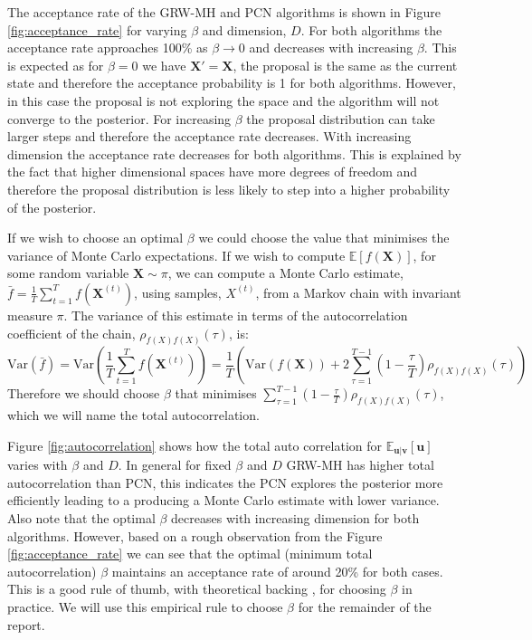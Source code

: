\documentclass[11pt]{article}
\begin{document}
The acceptance rate of the GRW-MH and PCN algorithms is shown in Figure \ref{fig:acceptance_rate} for varying $\beta$ and dimension, $D$. For both algorithms the acceptance rate approaches 100\% as $\beta \to 0$ and decreases with increasing $\beta$. This is expected as for $\beta = 0$ we have $\boldsymbol{X}' = \boldsymbol{X}$, the proposal is the same as the current state and therefore the acceptance probability is 1 for both algorithms. However, in this case the proposal is not exploring the space and the algorithm will not converge to the posterior. For increasing $\beta$ the proposal distribution can take larger steps and therefore the acceptance rate decreases. With increasing dimension the acceptance rate decreases for both algorithms. This is explained by the fact that higher dimensional spaces have more degrees of freedom and therefore the proposal distribution is less likely to step into a higher probability of the posterior.

If we wish to choose an optimal $\beta$ we could choose the value that minimises the variance of Monte Carlo expectations. If we wish to compute $\mathbb{E}[f(\boldsymbol{X})]$, for some random variable $\boldsymbol{X} \sim \pi$, we can compute a Monte Carlo estimate, $\bar{f} = \frac{1}{T} \sum_{t=1}^{T} f(\boldsymbol{X}^{(t)})$, using samples, $X^{(t)}$, from a Markov chain with invariant measure $\pi$. The variance of this estimate in terms of the autocorrelation coefficient of the chain, $\rho_{f(X)f(X)}(\tau)$, is:
\begin{equation}
    \text{Var}(\bar{f}) = \text{Var}(\frac{1}{T} \sum_{t=1}^{T} f(\boldsymbol{X}^{(t)})) = \frac{1}{T} \left(\text{Var}(f(\boldsymbol{X})) + 2 \sum_{\tau=1}^{T-1} (1-\frac{\tau}{T}) \rho_{f(X)f(X)}(\tau)\right)
\end{equation}
Therefore we should choose $\beta$ that minimises $\sum_{\tau=1}^{T-1} (1-\frac{\tau}{T}) \rho_{f(X)f(X)}(\tau)$, which we will name the total autocorrelation.

Figure \ref{fig:autocorrelation} shows how the total auto correlation for $\mathbb{E}_{\boldsymbol{u}|\boldsymbol{v}}[\boldsymbol{u}]$ varies with $\beta$ and $D$. In general for fixed $\beta$ and $D$ GRW-MH has higher total autocorrelation than PCN, this indicates the PCN explores the posterior more efficiently leading to a producing a Monte Carlo estimate with lower variance. Also note that the optimal $\beta$ decreases with increasing dimension for both algorithms. However, based on a rough observation from the Figure \ref{fig:acceptance_rate} we can see that the optimal (minimum total autocorrelation) $\beta$ maintains an acceptance rate of around 20\% for both cases. This is a good rule of thumb, with theoretical backing \cite{sherlock}, for choosing $\beta$ in practice. We will use this empirical rule to choose $\beta$ for the remainder of the report.
\end{document}
